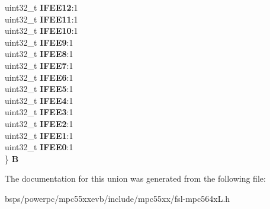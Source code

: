 \begin{DoxyCompactItemize}
\begin{tabbing}
\>uint32\_t {\bfseries IFEE12}:1\\
\>uint32\_t {\bfseries IFEE11}:1\\
\>uint32\_t {\bfseries IFEE10}:1\\
\>uint32\_t {\bfseries IFEE9}:1\\
\>uint32\_t {\bfseries IFEE8}:1\\
\>uint32\_t {\bfseries IFEE7}:1\\
\>uint32\_t {\bfseries IFEE6}:1\\
\>uint32\_t {\bfseries IFEE5}:1\\
\>uint32\_t {\bfseries IFEE4}:1\\
\>uint32\_t {\bfseries IFEE3}:1\\
\>uint32\_t {\bfseries IFEE2}:1\\
\>uint32\_t {\bfseries IFEE1}:1\\
\>uint32\_t {\bfseries IFEE0}:1\\
\} {\bfseries B}\\

\end{tabbing}\end{DoxyCompactItemize}


The documentation for this union was generated from the following file\+:\begin{DoxyCompactItemize}
\item 
bsps/powerpc/mpc55xxevb/include/mpc55xx/fsl-\/mpc564x\+L.\+h\end{DoxyCompactItemize}
